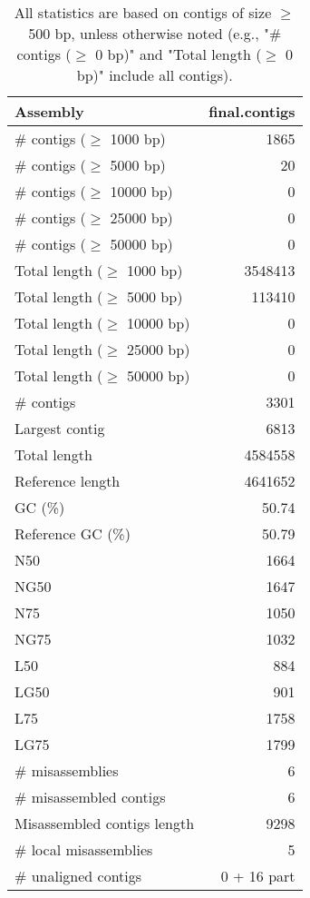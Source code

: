 \documentclass[12pt,a4paper]{article}
\begin{document}
\begin{table}[ht]
\begin{center}
\caption{All statistics are based on contigs of size $\geq$ 500 bp, unless otherwise noted (e.g., "\# contigs ($\geq$ 0 bp)" and "Total length ($\geq$ 0 bp)" include all contigs).}
\begin{tabular}{|l*{1}{|r}|}
\hline
Assembly & final.contigs \\ \hline
\# contigs ($\geq$ 1000 bp) & 1865 \\ \hline
\# contigs ($\geq$ 5000 bp) & 20 \\ \hline
\# contigs ($\geq$ 10000 bp) & 0 \\ \hline
\# contigs ($\geq$ 25000 bp) & 0 \\ \hline
\# contigs ($\geq$ 50000 bp) & 0 \\ \hline
Total length ($\geq$ 1000 bp) & 3548413 \\ \hline
Total length ($\geq$ 5000 bp) & 113410 \\ \hline
Total length ($\geq$ 10000 bp) & 0 \\ \hline
Total length ($\geq$ 25000 bp) & 0 \\ \hline
Total length ($\geq$ 50000 bp) & 0 \\ \hline
\# contigs & 3301 \\ \hline
Largest contig & 6813 \\ \hline
Total length & 4584558 \\ \hline
Reference length & 4641652 \\ \hline
GC (\%) & 50.74 \\ \hline
Reference GC (\%) & 50.79 \\ \hline
N50 & 1664 \\ \hline
NG50 & 1647 \\ \hline
N75 & 1050 \\ \hline
NG75 & 1032 \\ \hline
L50 & 884 \\ \hline
LG50 & 901 \\ \hline
L75 & 1758 \\ \hline
LG75 & 1799 \\ \hline
\# misassemblies & 6 \\ \hline
\# misassembled contigs & 6 \\ \hline
Misassembled contigs length & 9298 \\ \hline
\# local misassemblies & 5 \\ \hline
\# unaligned contigs & 0 + 16 part \\ \hline

\end{tabular}
\end{center}
\end{table}
\end{document}
